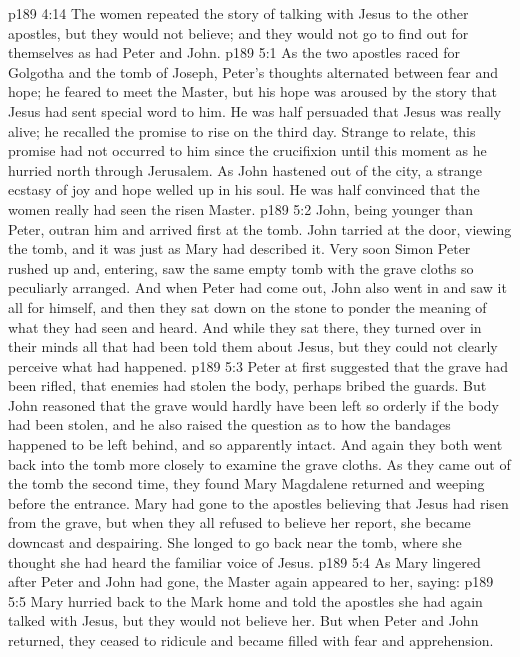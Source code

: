 \vs p189 4:14 The women repeated the story of talking with Jesus to the other apostles, but they would not believe; and they would not go to find out for themselves as had Peter and John.
\vs p189 5:1 As the two apostles raced for Golgotha and the tomb of Joseph, Peter’s thoughts alternated between fear and hope; he feared to meet the Master, but his hope was aroused by the story that Jesus had sent special word to him. He was half persuaded that Jesus was really alive; he recalled the promise to rise on the third day. Strange to relate, this promise had not occurred to him since the crucifixion until this moment as he hurried north through Jerusalem. As John hastened out of the city, a strange ecstasy of joy and hope welled up in his soul. He was half convinced that the women really had seen the risen Master.
\vs p189 5:2 John, being younger than Peter, outran him and arrived first at the tomb. John tarried at the door, viewing the tomb, and it was just as Mary had described it. Very soon Simon Peter rushed up and, entering, saw the same empty tomb with the grave cloths so peculiarly arranged. And when Peter had come out, John also went in and saw it all for himself, and then they sat down on the stone to ponder the meaning of what they had seen and heard. And while they sat there, they turned over in their minds all that had been told them about Jesus, but they could not clearly perceive what had happened.
\vs p189 5:3 Peter at first suggested that the grave had been rifled, that enemies had stolen the body, perhaps bribed the guards. But John reasoned that the grave would hardly have been left so orderly if the body had been stolen, and he also raised the question as to how the bandages happened to be left behind, and so apparently intact. And again they both went back into the tomb more closely to examine the grave cloths. As they came out of the tomb the second time, they found Mary Magdalene returned and weeping before the entrance. Mary had gone to the apostles believing that Jesus had risen from the grave, but when they all refused to believe her report, she became downcast and despairing. She longed to go back near the tomb, where she thought she had heard the familiar voice of Jesus.
\vs p189 5:4 As Mary lingered after Peter and John had gone, the Master again appeared to her, saying: 
\vs p189 5:5 Mary hurried back to the Mark home and told the apostles she had again talked with Jesus, but they would not believe her. But when Peter and John returned, they ceased to ridicule and became filled with fear and apprehension.
